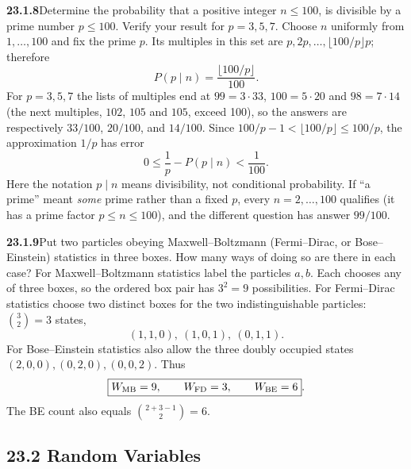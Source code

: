 \par\bigskip
\noindent\textbf{23.1.8}\quad Determine the probability that a
positive integer $n\le100$,  is divisible
by a  prime number $p\le100$.
Verify your result for $p=3,5,7$.
\solution
Choose $n$ uniformly from $1,\ldots,100$ and fix the prime $p$.
Its multiples in this set are $p,2p,\ldots,\lfloor100/p\rfloor p$;
therefore
\[
\boxed{P(p\mid n)=\frac{\lfloor100/p\rfloor}{100}}.
\]
For $p=3,5,7$ the lists of multiples end at $99=3\cdot33$,
$100=5\cdot20$ and $98=7\cdot14$ (the next multiples, $102$, $105$
and $105$, exceed 100), so the answers are respectively $33/100$,
$20/100$, and $14/100$. Since
$100/p-1<\lfloor100/p\rfloor\le100/p$, the approximation $1/p$ has
error
\[
0\le\frac1p-P(p\mid n)<\frac1{100}.
\]
Here the notation $p\mid n$ means divisibility, not conditional probability.
If ``a prime'' meant \emph{some} prime rather than a fixed $p$, every
$n=2,\ldots,100$ qualifies (it has a prime factor $p\le n\le100$), and
the different question has answer $99/100$.


\par\bigskip
\noindent\textbf{23.1.9}\quad Put two particles obeying
Maxwell--Boltzmann (Fermi--Dirac, or Bose--Einstein) statistics
in three boxes. How many ways of doing so are there in each case?
\solution
For Maxwell--Boltzmann statistics label the particles $a,b$.
Each chooses any of three boxes, so the ordered box pair has $3^2=9$
possibilities. For Fermi--Dirac statistics choose two distinct boxes
for the two indistinguishable particles: $\binom32=3$ states,
\[
(1,1,0),\ (1,0,1),\ (0,1,1).
\]
For Bose--Einstein statistics also allow the three doubly occupied
states $(2,0,0),(0,2,0),(0,0,2)$. Thus
\[
\boxed{W_{\rm MB}=9,\qquad W_{\rm FD}=3,\qquad W_{\rm BE}=6}.
\]
The BE count also equals $\binom{2+3-1}{2}=6$.


\subsection*{23.2 Random Variables}


